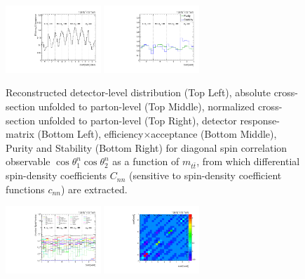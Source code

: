\begin{refsection}
\begin{figure}[htb]
\begin{center}
 \includegraphics[width=0.32\textwidth]{fig_fullRun2UL/unfolding/combined/TotEff_c_nn_mttbar.pdf}
 \includegraphics[width=0.32\textwidth]{fig_fullRun2UL/unfolding/combined/PurStab_c_nn_mttbar.pdf} \\
\caption{Reconstructed detector-level distribution (Top Left), absolute cross-section unfolded to parton-level (Top Middle), normalized cross-section unfolded to parton-level (Top Right), detector response-matrix (Bottom Left), efficiency$\times$acceptance (Bottom Middle), Purity and Stability (Bottom Right) for diagonal spin correlation observable $\cos\theta_{1}^{n}\cos\theta_{2}^{n}$ as a function of $m_{t\bar{t}}$, from which differential spin-density coefficients $C_{nn}$ (sensitive to spin-density coefficient functions $c_{n n}$) are extracted.}
\label{fig:c_nn_mttbar}
\end{center}
\end{figure}
\clearpage
\begin{figure}[htb]
\begin{center}
 \includegraphics[width=0.32\textwidth]{fig_fullRun2UL/unfolding/combined/deltaSystCombinedlog_rebinnedB_c_nn_mttbar.pdf}
 \includegraphics[width=0.32\textwidth]{fig_fullRun2UL/unfolding/combined/StatCovMatrix_rebinnedB_c_nn_mttbar.pdf}

\end{center}
\end{figure}
\end{refsection}

